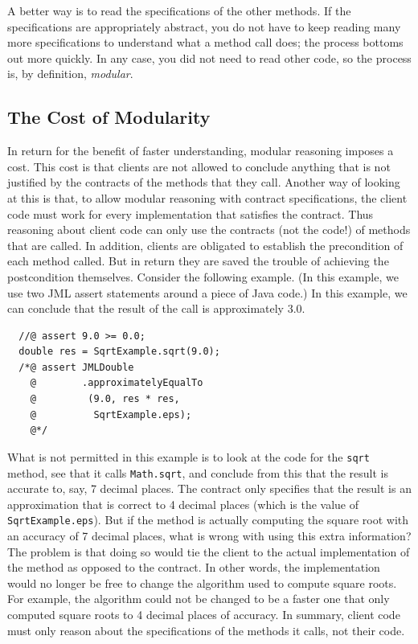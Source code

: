\documentclass[twocolumn]{article}
\begin{document}
A better way is to read the specifications of the other methods.
If the specifications are appropriately abstract, you do not have to
keep reading many more specifications to understand what a method call
does; the process bottoms out more quickly.  In any case, you did not
need to read other code, so the process is, by definition, \emph{modular}.

\subsection{The Cost of Modularity}

In return for the benefit of faster understanding, modular reasoning
imposes a cost.  This cost is that clients are not allowed to conclude
anything that is not justified by the contracts of the methods that
they call.  Another way of looking at this is that,
to allow modular reasoning with contract specifications, the
client code must work for every implementation that satisfies
the contract.  Thus reasoning about client code can only use the
contracts (not the code!) of methods that are called.
In addition, clients are obligated to establish the precondition of
each method called.  But in return they are saved the trouble of
achieving the postcondition themselves.  Consider the following
example.  (In this example, we use two JML assert statements around a
piece of Java code.)  In this example, we can conclude that the result
of the call is approximately 3.0.

\begin{verbatim}
  //@ assert 9.0 >= 0.0;
  double res = SqrtExample.sqrt(9.0);
  /*@ assert JMLDouble
    @        .approximatelyEqualTo
    @         (9.0, res * res,
    @          SqrtExample.eps);
    @*/
\end{verbatim}

What is not permitted in this example is to look at the code for the
\texttt{sqrt} method, see that it calls \texttt{Math.sqrt}, and conclude from
this that the result is accurate to, say, 7 decimal places.  The
contract only specifies that the result is an approximation that is
correct to 4 decimal places (which is the value of \texttt{SqrtExample.eps}).
But if the method is actually computing
the square root with an accuracy of 7 decimal places, what is wrong
with using this extra information?  The problem is that doing so would
tie the client to the actual implementation of the method as opposed
to the contract.  In other words, the implementation would no longer
be free to change the algorithm used to compute square roots.
For example, the algorithm could not be changed to be a faster one
that only computed square roots to 4 decimal places of accuracy.
In summary, client code must only reason about the specifications of
the methods it calls, not their code.
\end{document}
